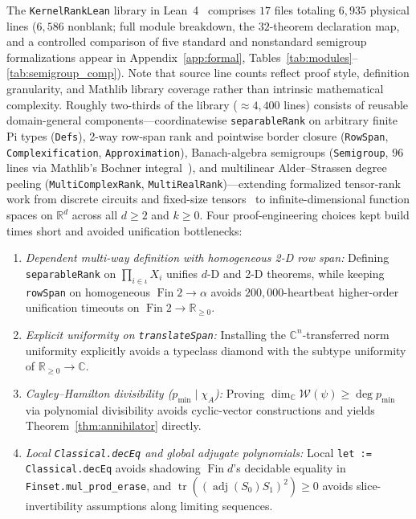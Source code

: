 \documentclass[11pt,a4paper]{article}
\theoremstyle{plain}
\theoremstyle{definition}
\newcommand{\R}{\mathbb{R}}
\newcommand{\C}{\mathbb{C}}
\newcommand{\Rnn}{\mathbb{R}_{\ge 0}}
\DeclareRobustCommand{\leanid}[1]{{\def\_{\textunderscore\allowbreak}\texttt{#1}}}
\begin{document}
The \texttt{KernelRankLean} library in Lean~4~\cite{moura2021lean4,mathlib2020} comprises $17$ files totaling $6{,}935$ physical lines ($6{,}586$ nonblank; full module breakdown, the $32$-theorem declaration map, and a controlled comparison of five standard and nonstandard semigroup formalizations appear in Appendix~\ref{app:formal}, Tables~\ref{tab:modules}--\ref{tab:semigroup_comp}). Note that source line counts reflect proof style, definition granularity, and Mathlib library coverage rather than intrinsic mathematical complexity. Roughly two-thirds of the library ($\approx 4{,}400$ lines) consists of reusable domain-general components---coordinatewise \leanid{separableRank} on arbitrary finite Pi types (\texttt{Defs}), 2-way row-span rank and pointwise border closure (\texttt{RowSpan}, \texttt{Complexification}, \texttt{Approximation}), Banach-algebra semigroups (\texttt{Semigroup}, $96$ lines via Mathlib's Bochner integral~\cite{dupuis2022formalized}), and multilinear Alder--Strassen degree peeling (\texttt{MultiComplexRank}, \texttt{MultiRealRank})---extending formalized tensor-rank work from discrete circuits and fixed-size tensors~\cite{bentkamp2019formal,jain2026octonion,yang2026matrix} to infinite-dimensional function spaces on $\R^d$ across all $d \ge 2$ and $k \ge 0$. Four proof-engineering choices kept build times short and avoided unification bottlenecks:
\begin{enumerate}[leftmargin=2em,itemsep=1pt]
  \item \emph{Dependent multi-way definition with homogeneous 2-D row span:} Defining \leanid{separableRank} on $\prod_{i \in \iota} X_i$ unifies $d$-D and 2-D theorems, while keeping \leanid{rowSpan} on homogeneous $\operatorname{Fin} 2 \to \alpha$ avoids $200{,}000$-heartbeat higher-order unification timeouts on $\operatorname{Fin} 2 \to \Rnn$.
  \item \emph{Explicit uniformity on \leanid{translateSpan}:} Installing the $\C^n$-transferred norm uniformity explicitly avoids a typeclass diamond with the subtype uniformity of $\Rnn \to \C$.
  \item \emph{Cayley--Hamilton divisibility ($p_{\min} \mid \chi_A$):} Proving $\dim_{\C}\mathcal{W}(\psi) \ge \deg p_{\min}$ via polynomial divisibility avoids cyclic-vector constructions and yields Theorem~\ref{thm:annihilator} directly.
  \item \emph{Local \texttt{Classical.decEq} and global adjugate polynomials:} Local \texttt{let := Classical.\allowbreak decEq} avoids shadowing $\operatorname{Fin} d$'s decidable equality in \texttt{Finset.\allowbreak mul\_\allowbreak prod\_\allowbreak erase}, and $\operatorname{tr}((\operatorname{adj}(S_0)S_1)^2) \ge 0$ avoids slice-invertibility assumptions along limiting sequences.
\end{enumerate}
\end{document}

